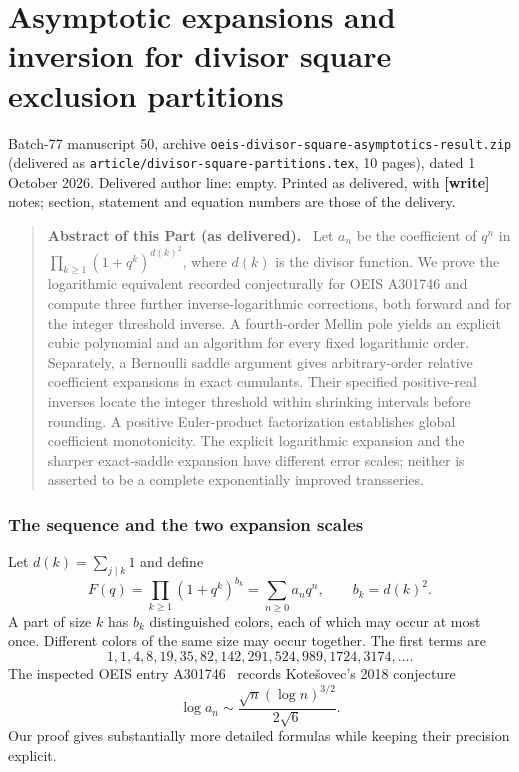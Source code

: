 \documentclass[11pt,letterpaper]{article}
\newcommand{\file}[1]{\nolinkurl{#1}}
\numberwithin{equation}{section}
\theoremstyle{remark}
\newenvironment{partabstract}{\begin{quote}\small\noindent\textbf{Abstract of this Part (as delivered).}\ }{\end{quote}}
\newcommand{\partsource}[1]{\par\noindent\begin{minipage}{\textwidth}\small #1\end{minipage}\par\medskip}
\begin{document}
\part{Asymptotic expansions and inversion for divisor square exclusion partitions}\label{dwa:part:sq}
\partsource{Batch-77 manuscript 50, archive \file{oeis-divisor-square-asymptotics-result.zip} (delivered as \file{article/divisor-square-partitions.tex}, 10 pages), dated 1 October 2026. Delivered author line: empty. Printed as delivered, with \textbf{[write]} notes; section, statement and equation numbers are those of the delivery.}
\begin{partabstract}
Let $a_n$ be the coefficient of $q^n$ in $\prod_{k\ge1}(1+q^k)^{d(k)^2}$, where $d(k)$ is the divisor function. We prove the logarithmic equivalent recorded conjecturally for OEIS A301746 and compute three further inverse-logarithmic corrections, both forward and for the integer threshold inverse. A fourth-order Mellin pole yields an explicit cubic polynomial and an algorithm for every fixed logarithmic order. Separately, a Bernoulli saddle argument gives arbitrary-order relative coefficient expansions in exact cumulants. Their specified positive-real inverses locate the integer threshold within shrinking intervals before rounding. A positive Euler-product factorization establishes global coefficient monotonicity. The explicit logarithmic expansion and the sharper exact-saddle expansion have different error scales; neither is asserted to be a complete exponentially improved transseries.
\end{partabstract}
\section{The sequence and the two expansion scales}
Let $d(k)=\sum_{j\mid k}1$ and define
\begin{equation}\label{dwa:sq:eq:product}
 F(q)=\prod_{k\ge1}(1+q^k)^{b_k}=\sum_{n\ge0}a_nq^n,
 \qquad b_k=d(k)^2.
\end{equation}
A part of size $k$ has $b_k$ distinguished colors, each of which may occur at most once. Different colors of the same size may occur together. The first terms are
\[
1,1,4,8,19,35,82,142,291,524,989,1724,3174,\ldots.
\]
The inspected OEIS entry A301746~\cite{sqOEIS} records Kote\v{s}ovec's 2018 conjecture
\begin{equation}\label{dwa:sq:eq:conjecture}
 \log a_n\sim \frac{\sqrt n(\log n)^{3/2}}{2\sqrt6}.
\end{equation}
Our proof gives substantially more detailed formulas while keeping their precision explicit.
\end{document}
